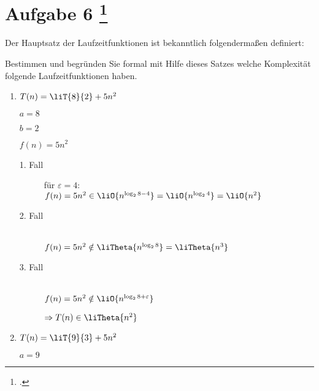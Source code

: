 \documentclass{lehramt-informatik-aufgabe}
\begin{document}
\let\O=\liO
\let\o=\liOmega
\let\T=\liT
\let\t=\liTheta

\section{Aufgabe 6
\footcite{66115:2019:09}}

Der Hauptsatz der Laufzeitfunktionen ist bekanntlich folgendermaßen
definiert:

\liMasterFaelle

\noindent
Bestimmen und begründen Sie formal mit Hilfe dieses Satzes welche
Komplexität folgende Laufzeitfunktionen haben.

\begin{enumerate}


\item $T(n) = \T{8}{2} + 5n^2$

\begin{liAntwort}
\liMasterVariablen

$a = 8$

$b = 2$

$f(n) = 5n^2$

\begin{description}

\item[1. Fall] für $\varepsilon = 4$: \\
$f(n) = 5n^2 \in \O{n^{\log_2 {8 - 4}}} = \O{n^{\log_2 4}} = \O{n^2}$

\item[2. Fall] \strut\\
$f(n) = 5n^2 \notin \t{n^{\log_2 {8}}} = \t{n^3}$

\item[3. Fall] \strut\\
$f(n) = 5n^2 \notin \O{n^{\log_2 {8 + \varepsilon}}}$

$\Rightarrow T(n) \in \t{n^2}$
\end{description}

\end{liAntwort}



\item $T(n) = \T{9}{3} + 5n^2$

\begin{liAntwort}
$a = 9$


\end{liAntwort}
\end{enumerate}
\end{document}
